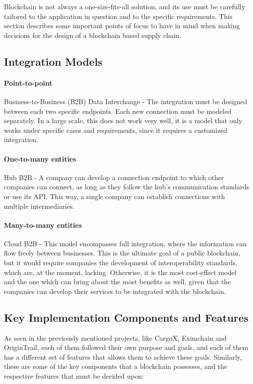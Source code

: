 Blockchain is not always a one-size-fits-all solution, and its use must be carefully tailored to the application in question and to the specific requirements. This section describes some important points of focus to have in mind when making decisions for the design of a blockchain based supply chain.

\subsection{Integration Models}
\paragraph{Point-to-point} Business-to-Business (B2B) Data Interchange - The integration must be designed between each two specific endpoints. Each new connection must be modeled separately. In a large scale, this does not work very well, it is a model that only works under specific cases and requirements, since it requires a customized integration.

\paragraph{One-to-many entities} Hub B2B - A company can develop a connection endpoint to which other companies can connect, as long as they follow the hub's communication standards or use its API. This way, a  single company can establish connections with multiple intermediaries.

\paragraph{Many-to-many entities} Cloud B2B - This model encompasses full integration, where the information can flow freely between businesses. This is the ultimate goal of a public blockchain, but it would require companies the development of interoperability standards, which are, at the moment, lacking. Otherwise, it is the most cost-effect model and the one which can bring about the most benefits as well, given that the companies can develop their services to be integrated with the blockchain.

\subsection{Key Implementation Components and Features}
As seen in the previously mentioned projects, like CargoX, Eximchain and OriginTrail, each of them followed their own purpose and goals, and each of them has a different set of features that allows them to achieve these goals. Similarly, these are some of the key components that a blockchain possesses, and the respective features that must be decided upon:

